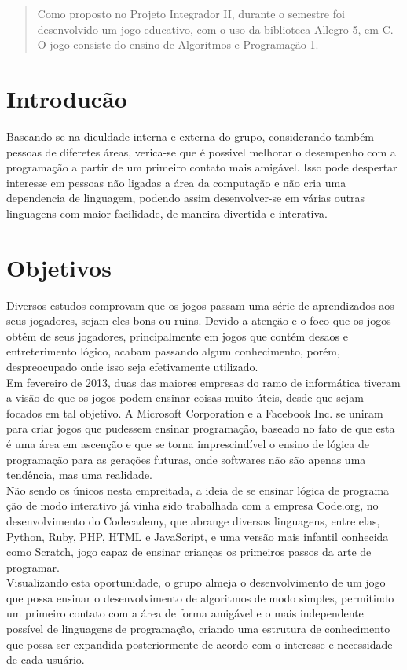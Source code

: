 \documentclass{sciposter}
\begin{document}
\begin{multicols}{3}

\begin{abstract}
Como proposto no Projeto Integrador II, durante o semestre foi desenvolvido um jogo educativo, com o uso da biblioteca Allegro 5, em C. O jogo consiste do ensino de Algoritmos e Programação 1.
\end{abstract}

\section{Introducão}
Baseando-se na diculdade interna e externa do grupo, considerando também pessoas de diferetes áreas, verica-se que é possivel melhorar o desempenho
com a programação a partir de um primeiro contato mais amigável. Isso pode
despertar interesse em pessoas não ligadas a área da computação e não cria
uma dependencia de linguagem, podendo assim desenvolver-se em várias outras
linguagens com maior facilidade, de maneira divertida e interativa.\\		
 





\section{Objetivos}
Diversos estudos comprovam que os jogos passam uma série de aprendizados
aos seus jogadores, sejam eles bons ou ruins. Devido a atenção e o foco que
os jogos obtém de seus jogadores, principalmente em jogos que contém desaos
e entreterimento lógico, acabam passando algum conhecimento, porém, despreocupado
onde isso seja efetivamente utilizado.\\
Em fevereiro de 2013, duas das maiores empresas do ramo de informática
tiveram a visão de que os jogos podem ensinar coisas muito úteis, desde que
sejam focados em tal objetivo. A Microsoft Corporation e a Facebook Inc. se
uniram para criar jogos que pudessem ensinar programação, baseado no fato
de que esta é uma área em ascenção e que se torna imprescindível o ensino de
lógica de programação para as gerações futuras, onde softwares não são apenas
uma tendência, mas uma realidade.\\
Não sendo os únicos nesta empreitada, a ideia de se ensinar lógica de programa
ção de modo interativo já vinha sido trabalhada com a empresa Code.org, no
desenvolvimento do Codecademy, que abrange diversas linguagens, entre elas,
Python, Ruby, PHP, HTML e JavaScript, e uma versão mais infantil conhecida
como Scratch, jogo capaz de ensinar crianças os primeiros passos da arte de
programar.\\
Visualizando esta oportunidade, o grupo almeja o desenvolvimento de um
jogo que possa ensinar o desenvolvimento de algoritmos de modo simples, permitindo
um primeiro contato com a área de forma amigável e o mais independente
possível de linguagens de programação, criando uma estrutura de conhecimento
que possa ser expandida posteriormente de acordo com o interesse e
necessidade de cada usuário.\\




\end{multicols}
\end{document}
